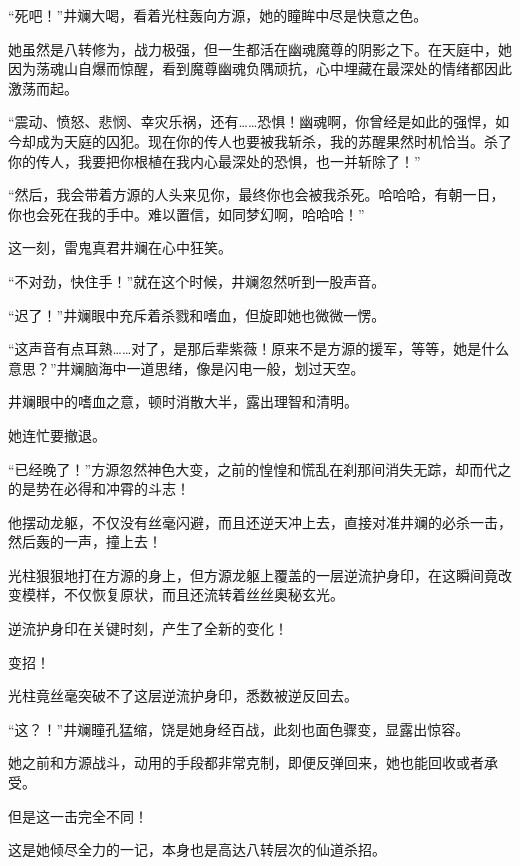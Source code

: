 
\begin{this_body}



“死吧！”井斓大喝，看着光柱轰向方源，她的瞳眸中尽是快意之色。

她虽然是八转修为，战力极强，但一生都活在幽魂魔尊的阴影之下。在天庭中，她因为荡魂山自爆而惊醒，看到魔尊幽魂负隅顽抗，心中埋藏在最深处的情绪都因此激荡而起。

“震动、愤怒、悲悯、幸灾乐祸，还有……恐惧！幽魂啊，你曾经是如此的强悍，如今却成为天庭的囚犯。现在你的传人也要被我斩杀，我的苏醒果然时机恰当。杀了你的传人，我要把你根植在我内心最深处的恐惧，也一并斩除了！”

“然后，我会带着方源的人头来见你，最终你也会被我杀死。哈哈哈，有朝一日，你也会死在我的手中。难以置信，如同梦幻啊，哈哈哈！”

这一刻，雷鬼真君井斓在心中狂笑。

“不对劲，快住手！”就在这个时候，井斓忽然听到一股声音。

“迟了！”井斓眼中充斥着杀戮和嗜血，但旋即她也微微一愣。

“这声音有点耳熟……对了，是那后辈紫薇！原来不是方源的援军，等等，她是什么意思？”井斓脑海中一道思绪，像是闪电一般，划过天空。

井斓眼中的嗜血之意，顿时消散大半，露出理智和清明。

她连忙要撤退。

“已经晚了！”方源忽然神色大变，之前的惶惶和慌乱在刹那间消失无踪，却而代之的是势在必得和冲霄的斗志！

他摆动龙躯，不仅没有丝毫闪避，而且还逆天冲上去，直接对准井斓的必杀一击，然后轰的一声，撞上去！

光柱狠狠地打在方源的身上，但方源龙躯上覆盖的一层逆流护身印，在这瞬间竟改变模样，不仅恢复原状，而且还流转着丝丝奥秘玄光。

逆流护身印在关键时刻，产生了全新的变化！

变招！

光柱竟丝毫突破不了这层逆流护身印，悉数被逆反回去。

“这？！”井斓瞳孔猛缩，饶是她身经百战，此刻也面色骤变，显露出惊容。

她之前和方源战斗，动用的手段都非常克制，即便反弹回来，她也能回收或者承受。

但是这一击完全不同！

这是她倾尽全力的一记，本身也是高达八转层次的仙道杀招。


\end{this_body}
